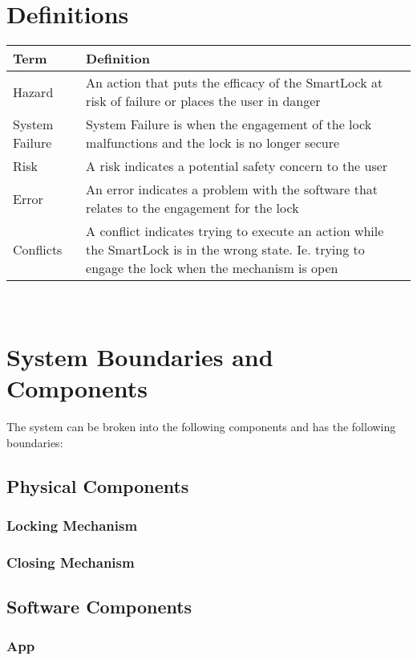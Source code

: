 \documentclass{article}
\begin{document}
\section{Definitions}

\begin{minipage}{\textwidth}
\renewcommand*{\arraystretch}{1.5}
\begin{tabular}{| p{} | p{} |}
 \hline
 Term & Definition \\ 
 \hline
 Hazard & An action that puts the efficacy of the SmartLock at risk of failure or places the user in danger\\ 
  \hline
 System Failure & System Failure is when the engagement of the lock malfunctions and the lock is no longer secure\\ 
  \hline
 Risk & A risk indicates a potential safety concern to the user\\ 
  \hline
 Error & An error indicates a problem with the software that relates to the engagement for the lock\\ 
  \hline
 Conflicts & A conflict indicates trying to execute an action while the SmartLock is in the wrong state. Ie. trying to engage the lock when the mechanism is open\\ 
 \hline
\end{tabular}
\end{minipage}\\

\section{System Boundaries and Components}
The system can be broken into the following components and has the following boundaries:
\subsection {Physical Components}
\subsubsection{Locking Mechanism}
\subsubsection{Closing Mechanism}
\subsection {Software Components}
\subsubsection {App}
\end{document}
